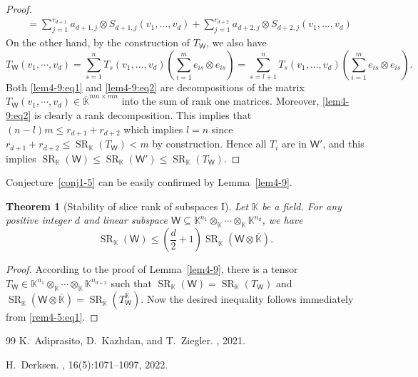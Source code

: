 \documentclass[10pt]{article}
\newtheorem{theorem}{Theorem}[section]
\theoremstyle{definition}
\DeclareMathOperator{\sr}{SR}
\begin{document}
\begin{proof}
\begin{align}
&= \sum_{j=1}^{r_{d+1}}a_{d+1,j} \otimes S_{d+1,j}(v_1,\dots, v_{d})
+ 
\sum_{j=1}^{r_{d+2}}a_{d+2,j} \otimes S_{d+2,j}(v_1,\dots, v_{d})
\label{lem4-9:eq1}
\end{align}
On the other hand,  by the construction of $T_{\mathsf{W}}$,  we also have 
\begin{equation}\label{lem4-9:eq2}
T_{\mathsf{W}}(v_{1},\cdots,v_{d})=
\sum_{s=1}^{n} T_{s} (v_1,\dots,  v_d)  \left( \sum_{i=1}^{m}  e_{is}\otimes e_{is} \right) = \sum_{s=l+1}^{n} T_{s} (v_1,\dots,  v_d)  \left( \sum_{i=1}^{m}  e_{is}\otimes e_{is} \right).
\end{equation}
Both \eqref{lem4-9:eq1} and \eqref{lem4-9:eq2} are decompositions of the matrix $T_{\mathsf{W}}(v_{1},\cdots,v_{d}) \in \overline{\mathbb{K}}^{mn \times mn}$ into the sum of rank one matrices.  Moreover,  \eqref{lem4-9:eq2} is clearly a rank decomposition. This implies that $(n-l)m \le r_{d+1} + r_{d+2}$ which implies $l=n$ since $r_{d+1}+r_{d+2}\le\sr_{\mathbb{K}}(T_{\mathsf{W}}) <  m$ by construction. Hence all $T_{i}$ are in $\mathsf{W}'$,  and this implies $\operatorname{SR}_{\mathbb{K}} (\mathsf{W}) \le \operatorname{SR}_{\mathbb{K}} (\mathsf{W}') \le \operatorname{SR}_{\mathbb{K}} ( T_\mathsf{W})$.
\end{proof}
\setcounter{theorem}{10}
Conjecture~\ref{conj1-5} can be easily confirmed by Lemma~\ref{lem4-9}.
\begin{theorem}[Stability of slice rank of subspaces I]
\label{thm:slrank-conj}
Let $\mathbb{K}$ be a field.  For any positive integer $d$ and linear subspace $\mathsf{W} \subseteq \mathbb{K}^{n_1} \otimes_{\mathbb{K}} \cdots \otimes_{\mathbb{K}} \mathbb{K}^{n_d}$,  we have 
\[
\sr_{\mathbb{K}}(\mathsf{W}) \le \left( \frac{d}{2} + 1\right)\sr_{\overline{\mathbb{K}}}\left( \mathsf{W} \otimes \overline{\mathbb{K}} \right).
\]
\end{theorem}
\begin{proof}
According to the proof of Lemma~\ref{lem4-9},  there is a tensor $T_{\mathsf{W}} \in \mathbb{K}^{n_1} \otimes_{\mathbb{K}} \cdots \otimes_{\mathbb{K}}  \mathbb{K}^{n_{d+2}}$ such that $\sr_{\mathbb{K}}(\mathsf{W})= \sr_{\mathbb{K}}(T_{\mathsf{W}})$ and $\sr_{\overline{\mathbb{K}}}(\mathsf{W} \otimes \overline{\mathbb{K}}) = \sr_{\overline{\mathbb{K}}}\left( T_{\mathsf{W}}^{\overline{\mathbb{K}}}\right)$.  Now the desired inequality follows immediately from \eqref{rem4-5:eq1}.
\end{proof}
\begin{thebibliography}{99}
K.~Adiprasito, D.~Kazhdan, and T.~Ziegler.
, 2021.

H.~Derksen.
, 16(5):1071--1097, 2022.

\end{thebibliography}
\end{document}
